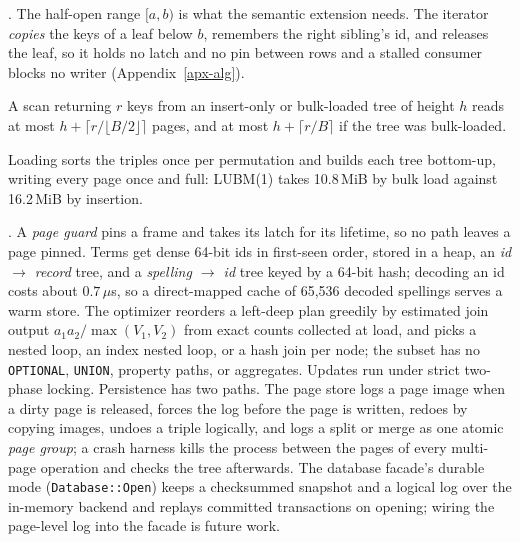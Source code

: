 .
The half-open range $[a,b)$ is what the semantic extension needs.
The iterator \emph{copies} the keys of a leaf below $b$, remembers the right
sibling's id, and releases the leaf, so it holds no latch and no pin between
rows and a stalled consumer blocks no writer (Appendix~\ref{apx-alg}).
\begin{lemma}\label{lem-scan}
A scan returning $r$ keys from an insert-only or bulk-loaded tree of height $h$
reads at most $h + \lceil r/\lfloor B/2\rfloor\rceil$ pages, and at most
$h+\lceil r/B\rceil$ if the tree was bulk-loaded.
\end{lemma}
Loading sorts the triples once per permutation and builds each tree bottom-up,
writing every page once and full: LUBM(1) takes 10.8\,MiB by bulk load against
16.2\,MiB by insertion.

.
A \emph{page guard} pins a frame and takes its latch for its lifetime, so no path
leaves a page pinned.
Terms get dense 64-bit ids in first-seen order, stored in a heap, an
\emph{id $\to$ record} tree, and a \emph{spelling $\to$ id} tree keyed by a
64-bit hash; decoding an id costs about $0.7\,\mu$s, so a direct-mapped cache
of 65,536 decoded spellings serves a warm store.
The optimizer reorders a left-deep plan greedily by estimated join output
$a_1a_2/\max(V_1,V_2)$ from exact counts collected at load, and picks a nested
loop, an index nested loop, or a hash join per node; the \sparql subset has no
\texttt{OPTIONAL}, \texttt{UNION}, property paths, or aggregates.
Updates run under strict two-phase locking.
Persistence has two paths.
The page store logs a page image when a dirty page is released, forces the log
before the page is written, redoes by copying images, undoes a triple logically,
and logs a split or merge as one atomic \emph{page group}; a crash harness kills
the process between the pages of every multi-page operation and checks the tree
afterwards.
The database facade's durable mode (\texttt{Database::Open}) keeps a checksummed
snapshot and a logical log over the in-memory backend and replays committed
transactions on opening; wiring the page-level log into the facade is future
work.
